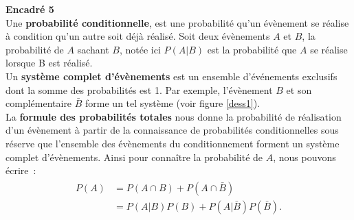 \setlength{\columnsep}{1cm}
\begin{minipage}{0.9\linewidth}
\textbf{Encadré 5} \\
Une \textbf{probabilité conditionnelle}, est une probabilité qu'un évènement se réalise à condition qu'un autre soit déjà réalisé. Soit deux évènements $A$ et $B$, la probabilité de $A$ sachant $B$, notée ici $P(A|B)$ est la probabilité que $A$ se réalise lorsque B est réalisé. \\
Un \textbf{système complet d'évènements} est un ensemble d'événements exclusifs dont la somme des probabilités est 1. Par exemple, l'évènement $B$ et son complémentaire $\bar{B}$ forme un tel système (voir figure \ref{dess1}).\\
La \textbf{formule des probabilités totales} nous donne la probabilité de réalisation d'un évènement à partir de la connaissance de probabilités conditionnelles sous réserve que l'ensemble des évènements du conditionnement forment un système complet d'évènements. Ainsi pour connaître la probabilité de $A$, nous pouvons écrire~:
\begin{align*}
\begin{split}
P(A)&=P(A\cap B)+ P(A\cap\bar{B})\\
& =P(A|B)P(B)+P(A|\bar{B})P(\bar{B}).\end{split} \end{align*}

\end{minipage}
